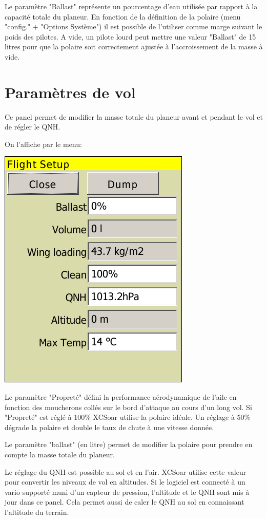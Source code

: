 Le paramètre "Ballast" représente un pourcentage d'eau utilisée par rapport à la capacité totale du planeur. En fonction de la définition de la polaire (menu "config." + "Options Système") il est possible de l'utiliser comme marge suivant le poids des pilotes. A vide, un pilote lourd peut mettre une valeur "Ballast" de 15 litres pour que la polaire soit correctement ajustée à l'accroissement de la masse à vide.

\section{Paramètres de vol}\label{sec:flight-setup}
Ce panel permet de modifier la masse totale du planeur avant et pendant le vol et de régler le QNH. 

On l'affiche par le menu: 
\begin{quote}
\blink{}
\end{quote}

\begin{center}
\includegraphics[angle=0,width=0.45\linewidth,keepaspectratio='true']{figures/dialog-basicsettings.png}
\end{center}

Le paramètre "Propreté" défini la performance aérodynamique de l'aile en fonction des moucherons collés sur le bord d'attaque au cours d'un long vol. Si "Propreté" est réglé à 100\% XCSoar utilise la polaire idéale. Un réglage à 50\% dégrade la polaire et double le taux de chute à une vitesse donnée.

Le paramètre "ballast" (en litre) permet de modifier la polaire pour prendre en compte la masse totale du planeur. 

Le réglage du QNH est possible au sol et en l'air. XCSoar utilise cette valeur pour convertir les niveaux de vol en altitudes. Si le logiciel est connecté à un vario supporté muni d'un capteur de pression, l'altitude et le QNH sont mis à jour dans ce panel. Cela permet aussi de caler le QNH au sol en connaissant l'altitude du terrain.


